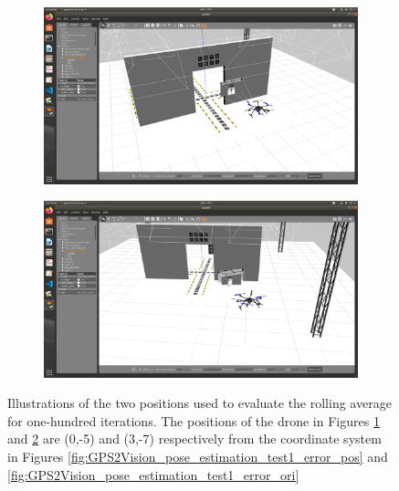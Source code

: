 \documentclass[../Head/report.tex]{subfiles}
\begin{document}
\begin{figure}[H]
    \centering
    \begin{subfigure}[t]{.30\textwidth}
        \centering
        \includegraphics[width=\textwidth]{../Figures/analyse_rolling_average/optimal_pose.png}
        \caption{}
        \label{fig:rolling_average_good_pos}
    \end{subfigure}
    \hspace{0.5em}
    \begin{subfigure}[t]{.30\textwidth}
        \centering
        \includegraphics[width=\textwidth]{../Figures/analyse_rolling_average/bad_pose.png}
        \caption{}
        \label{fig:rolling_average_bad_pos}
    \end{subfigure}
    \caption{Illustrations of the two positions used to evaluate the rolling average for one-hundred iterations. The positions of the drone in Figures \ref{fig:rolling_average_good_pos} and \ref{fig:rolling_average_bad_pos} are (0,-5) and (3,-7) respectively from the coordinate system in Figures \ref{fig:GPS2Vision_pose_estimation_test1_error_pos} and \ref{fig:GPS2Vision_pose_estimation_test1_error_ori}} 
    \label{fig:rolling_average_pos}
\end{figure}
\end{document}
